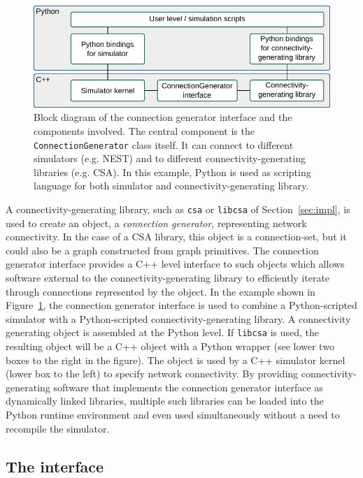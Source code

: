\documentclass{frontiersSCNS} %
\newcommand{\INLINEFIGS}{} %
\newcommand{\Figure}[2]{Figure~\ref{#2}}
\newcommand{\Figure}[2]{Figure~#1}
\begin{document}
\ifdefined\INLINEFIGS
\begin{figure}[ht]
\centering
\includegraphics[scale=.8]{figures/block_diagram_conngen.pdf}
\caption{Block diagram of the connection generator interface and the
  components involved. The central component is the
  \texttt{ConnectionGenerator} class itself. It can connect to different
  simulators (e.g. NEST) and to different connectivity-generating
  libraries (e.g. CSA). In this example, Python is used as scripting
  language for both simulator and connectivity-generating
  library.}\label{fig:block_diagram_conngen}
\end{figure}
\fi

A connectivity-generating library, such as \verb|csa| or \verb|libcsa|
of Section~\ref{sec:impl}, is used to create an object, a
\emph{connection generator}, representing network connectivity.  In
the case of a CSA library, this object is a connection-set, but it
could also be a graph constructed from graph primitives. The
connection generator interface provides a C++ level interface to such
objects which allows software external to the connectivity-generating
library to efficiently iterate through connections represented by the
object.  In the example shown in
\Figure{2}{fig:block_diagram_conngen}, the connection generator
interface is used to combine a Python-scripted simulator with a
Python-scripted connectivity-generating library.  A connectivity
generating object is assembled at the Python level.  If \verb|libcsa|
is used, the resulting object will be a C++ object with a Python
wrapper (see lower two boxes to the right in the figure). The object
is used by a C++ simulator kernel (lower box to the left) to specify
network connectivity. By providing connectivity-generating software
that implements the connection generator interface as dynamically
linked libraries, multiple such libraries can be loaded into the
Python runtime environment and even used simultaneously without a need
to recompile the simulator.

\subsection{The interface}\label{sec:cgint}
\end{document}

